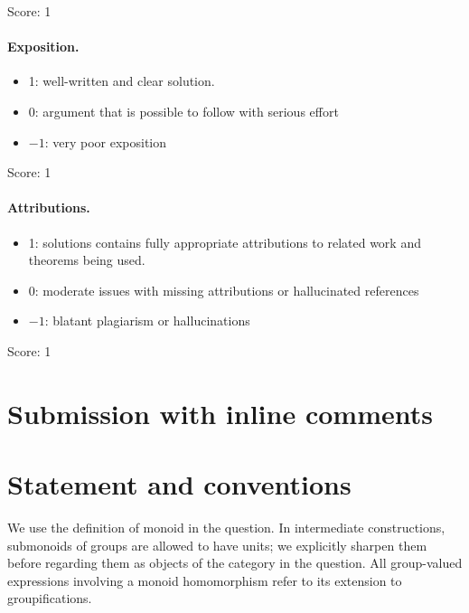 \documentclass[11pt]{article}
\theoremstyle{definition}
\theoremstyle{remark}
\begin{document}
\noindent Score: 1

\paragraph{Exposition.}
\begin{itemize}
	\item  1: well-written and clear solution.
	\item  0: argument that is possible to follow with serious effort
	\item  $-1$: very poor exposition
\end{itemize}

\noindent Score: 1

\paragraph{Attributions.}
\begin{itemize}
	\item  1: solutions contains fully appropriate attributions
		to related work and theorems being used.
	\item  0: moderate issues with missing attributions or hallucinated references
	\item  $-1$: blatant plagiarism or hallucinations
\end{itemize}

\noindent Score: 1

\newpage
\section{Submission with inline comments}


\begin{abstract}
The answer to the question is affirmative, without a finite-generation
hypothesis on the monoid. We prove a stronger statement: the presheaf
left Kan extension of the given presheaf is already a birhizomic sheaf
and is acyclic on every object of the birhizomic site. The proof uses
finite refinements of birhizomic covers, a finite convex-cover
calculation, and passage to filtered unions of finitely generated
saturated monoids.
\end{abstract}

\section{Statement and conventions}

We use the definition of monoid in the question. In intermediate
constructions, submonoids of groups are allowed to have units; we
explicitly sharpen them before regarding them as objects of the
category in the question. All group-valued expressions involving a
monoid homomorphism refer to its extension to groupifications.
\end{document}
